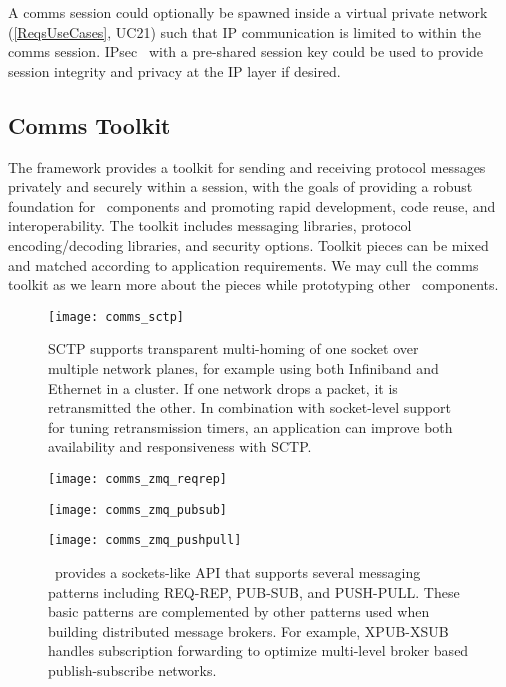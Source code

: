 A comms session could optionally be spawned inside a virtual private
network (\ref{ReqsUseCases}, UC21) such that IP communication
is limited to within the comms session.  IPsec~\cite{rfc2401} with
a pre-shared session key could be used to provide session integrity and
privacy at the IP layer if desired.

\subsection{Comms Toolkit}

The framework provides a toolkit for sending and receiving
protocol messages privately and securely within a session,
with the goals of providing a robust foundation for \ngrm\ components
and promoting rapid development, code reuse, and interoperability.
The toolkit includes messaging libraries,
protocol encoding/decoding libraries, and security options.
Toolkit pieces can be mixed and matched according to application
requirements.  We may cull the comms toolkit as we learn more
about the pieces while prototyping other \ngrm\ components.

\begin{figure}
\centering
\texttt{[image: comms\_sctp]}
\caption{SCTP supports transparent multi-homing of one socket over multiple
network planes, for example using both Infiniband and Ethernet in a cluster.
If one network drops a packet, it is retransmitted the other.
In combination with socket-level support for tuning retransmission timers,
an application can improve both availability and responsiveness with SCTP.}
\label{FigCommsSCTP}
\end{figure}

\begin{figure}
\begin{minipage}[b]{0.15\linewidth}
\texttt{[image: comms\_zmq\_reqrep]}
\end{minipage}
\hspace{0.5cm}
\begin{minipage}[b]{0.4\linewidth}
\texttt{[image: comms\_zmq\_pubsub]}
\end{minipage}
\hspace{0.5cm}
\begin{minipage}[b]{0.4\linewidth}
\texttt{[image: comms\_zmq\_pushpull]}
\end{minipage}
\caption{\zMQ\ provides a sockets-like API that supports several
messaging patterns including REQ-REP, PUB-SUB, and PUSH-PULL.
These basic patterns are complemented by other patterns used when
building distributed message brokers.  For example, XPUB-XSUB handles
subscription forwarding to optimize multi-level broker based
publish-subscribe networks.}
\label{FigCommsZmq}
\end{figure}

